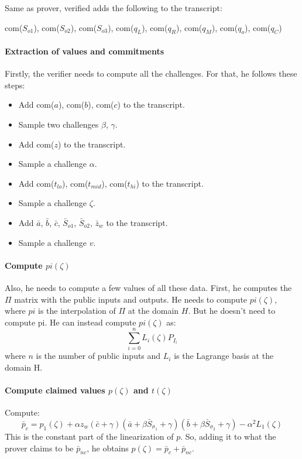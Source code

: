 \documentclass[../lecture-notes.tex]{subfiles}
\begin{document}
Same as prover, verified adds the following to the transcript:

\begin{center}
com($S_{o1}$), com($S_{o2}$), com($S_{o3}$), com($q_L$), com($q_R$), com($q_M$), com($q_o$), com($q_C$)
\end{center}

\paragraph{Extraction of values and commitments}

Firstly, the verifier needs to compute all the challenges. For that, he follows these steps:
\begin{itemize}
    \item Add com($a$), com($b$), com($c$) to the transcript.
    \item Sample two challenges $\beta$, $\gamma$.
    \item Add com($z$) to the transcript.
    \item Sample a challenge $\alpha$.
    \item Add com($t_{lo}$), com($t_{mid}$), com($t_{hi}$) to the transcript.
    \item Sample a challenge $\zeta$.
    \item Add $\bar{a}$, $\bar{b}$, $\bar{c}$, $\bar{S}_{o1}$, $\bar{S}_{o2}$, $\bar{z}_w$ to the transcript.
    \item Sample a challenge $v$.
\end{itemize}

\paragraph{Compute $pi(\zeta)$}
Also, he needs to compute a few values of all these data. First, he computes the $\Pi$ matrix with the public inputs and outputs. He needs to compute $pi(\zeta)$, where $pi$ is the interpolation of $\Pi$ at the domain $H$. But he doesn't need to compute pi. He can instead compute $pi(\zeta)$ as:
\[\sum_{i=0}^{n} L_{i}(\zeta) P_{I_i}\]
where $n$ is the number of public inputs and $L_i$ is the Lagrange basis at the domain H.

\paragraph{Compute claimed values $p(\zeta)$ and $t(\zeta)$}
Compute: 
\[\bar{p}_c = p_1(\zeta) + \alpha z_{w} \left( \bar{c} + \gamma \right) \left( \bar{a} + \beta \bar{S}_{\sigma_1} + \gamma \right) \left( \bar{b} + \beta \bar{S}_{\sigma_2} + \gamma \right) - \alpha^2 L_1(\zeta)\]
This is the constant part of the linearization of $p$. So, adding it to what the prover claims to be $\bar{p}_{nc}$, he obtains $p(\zeta) = \bar{p}_c + \bar{p}_{nc}$.
\end{document}
